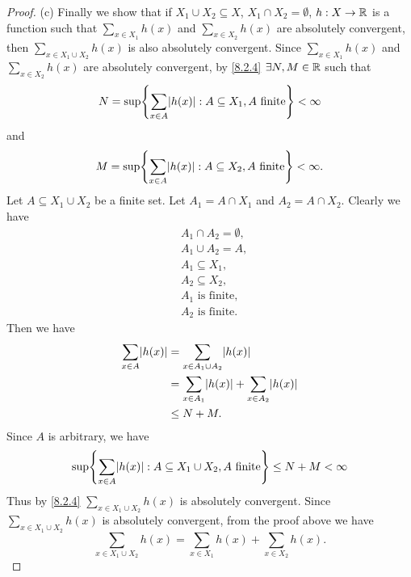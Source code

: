 \begin{proof}{(c)}
	Finally we show that if \(X_1 \cup X_2 \subseteq X\), \(X_1 \cap X_2 = \emptyset\), \(h : X \to \mathbb{R}\) is a function such that \(\sum_{x \in X_1} h(x)\) and \(\sum_{x \in X_2} h(x)\) are absolutely convergent, then \(\sum_{x \in X_1 \cup X_2} h(x)\) is also absolutely convergent.
	Since \(\sum_{x \in X_1} h(x)\) and \(\sum_{x \in X_2} h(x)\) are absolutely convergent, by \cref{8.2.4} \(\exists N, M \in \mathbb{R}\) such that
	\[
		N = \sup\set{\sum_{x \in A} \abs{h(x)} : A \subseteq X_1, A \text{ finite}} < \infty
	\]
	and
	\[
		M = \sup\set{\sum_{x \in A} \abs{h(x)} : A \subseteq X_2, A \text{ finite}} < \infty.
	\]
	Let \(A \subseteq X_1 \cup X_2\) be a finite set.
	Let \(A_1 = A \cap X_1\) and \(A_2 = A \cap X_2\).
	Clearly we have
	\begin{align*}
		 & A_1 \cap A_2 = \emptyset, \\
		 & A_1 \cup A_2 = A,         \\
		 & A_1 \subseteq X_1,        \\
		 & A_2 \subseteq X_2,        \\
		 & A_1 \text{ is finite},    \\
		 & A_2 \text{ is finite}.
	\end{align*}
	Then we have
	\begin{align*}
		\sum_{x \in A} \abs{h(x)} & = \sum_{x \in A_1 \cup A_2} \abs{h(x)}                      \\
		                          & = \sum_{x \in A_1} \abs{h(x)} + \sum_{x \in A_2} \abs{h(x)} \\
		                          & \leq N + M.
	\end{align*}
	Since \(A\) is arbitrary, we have
	\[
		\sup\set{\sum_{x \in A} \abs{h(x)} : A \subseteq X_1 \cup X_2, A \text{ finite}} \leq N + M < \infty
	\]
	Thus by \cref{8.2.4} \(\sum_{x \in X_1 \cup X_2} h(x)\) is absolutely convergent.
	Since \(\sum_{x \in X_1 \cup X_2} h(x)\) is absolutely convergent, from the proof above we have
	\[
		\sum_{x \in X_1 \cup X_2} h(x) = \sum_{x \in X_1} h(x) + \sum_{x \in X_2} h(x).
	\]
\end{proof}

